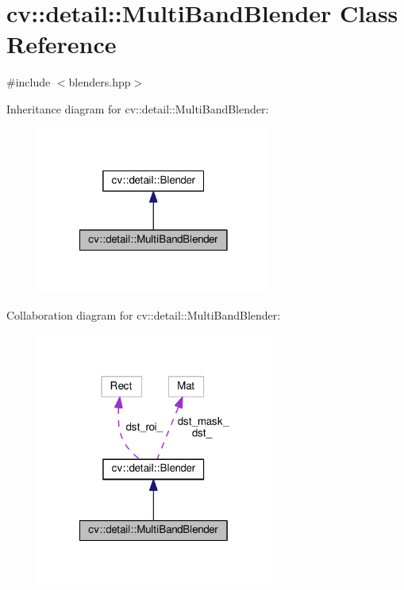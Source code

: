 \hypertarget{classcv_1_1detail_1_1MultiBandBlender}{\section{cv\-:\-:detail\-:\-:Multi\-Band\-Blender Class Reference}
\label{classcv_1_1detail_1_1MultiBandBlender}
}


{\ttfamily \#include $<$blenders.\-hpp$>$}



Inheritance diagram for cv\-:\-:detail\-:\-:Multi\-Band\-Blender\-:\nopagebreak
\begin{figure}[H]
\begin{center}
\leavevmode
\includegraphics[width=218pt]{classcv_1_1detail_1_1MultiBandBlender__inherit__graph}
\end{center}
\end{figure}


Collaboration diagram for cv\-:\-:detail\-:\-:Multi\-Band\-Blender\-:\nopagebreak
\begin{figure}[H]
\begin{center}
\leavevmode
\includegraphics[width=221pt]{classcv_1_1detail_1_1MultiBandBlender__coll__graph}
\end{center}
\end{figure}
